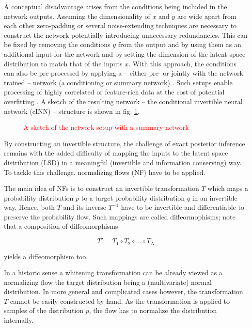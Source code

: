 
A conceptual disadvantage arises from the conditions being included in the network outputs. Assuming the dimensionality of $x$ and $y$ are wide apart from each other zero-padding or several noise-extending techniques are necessary to construct the network potentially introducing unnecessary redundancies. This can be fixed by removing the conditions $y$ from the output and by using them as an additional input for the network and by setting the dimension of the latent space distribution to match that of the inputs $x$. With this approach, the conditions can also be pre-processed by applying a -- either pre- or jointly with the network trained -- network (a conditioning or summary network) \cite{BayesFlow}. Such setups enable processing of highly correlated or feature-rich data at the cost of potential overfitting \cite{Ksoll_2020}. A sketch of the resulting network -- the conditional invertible neural network (cINN) -- structure is shown in fig. \ref{fig:cINN_archicture}.

\begin{figure}
	\caption{\textcolor{red}{A sketch of the network setup with a summary network}}
	\label{fig:cINN_archicture}
\end{figure}

By constructing an invertible structure, the challenge of exact posterior inference remains with the added difficulty of mapping the inputs to the latent space distribution (LSD) in a meaningful (invertible and information conserving) way. To tackle this challenge, normalizing flows (NF) have to be applied.


The main idea of NFs is to construct an invertible transformation $T$ which maps a probability distribution $p$ to a target probability distribution $q$ in an invertible way. Hence, both $T$ and its inverse $T^{-1}$ have to be invertible and differentiable to preserve the probability flow. Such mappings are called diffeormophisms; note that a composition of diffeomorphisms

\begin{equation*}
	T' = T_1 \circ T_2 \circ ... \circ T_N
\end{equation*}

yields a diffeomorphism too.

In a historic sense a whitening transformation can be already viewed as a normalizing flow the target distribution being a (multivariate) normal distribution. In more general and complicated cases however, the transformation $T$ cannot be easily constructed by hand. As the transformation is applied to samples of the distribution $p$, the flow has to normalize the distribution internally.


